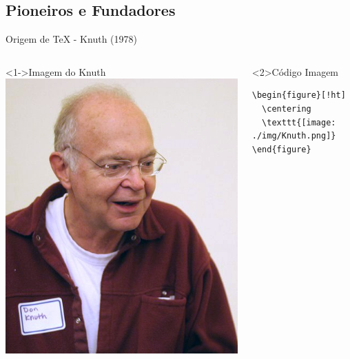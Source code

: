 \documentclass[bigger]{beamer}
\begin{document}
{\subsection{Pioneiros e Fundadores}
\label{sec:org29181d3}
\begin{frame}[label={sec:org22f25d4},fragile]{Origem de \TeX{} - Knuth (1978)}
 \begin{columns}
\begin{column}{0.48\columnwidth}
\begin{block}<1->{Imagem do Knuth}
\href{img/KnuthAtOpenContentAlliance.jpg}{\includegraphics[width=1.02\textwidth]{./img/KnuthAtOpenContentAlliance.jpg}}
\end{block}
\end{column}
\begin{column}{0.48\columnwidth}
\begin{block}<2>{Código Imagem}
\begin{verbatim}
\begin{figure}[!ht]
  \centering
  \texttt{[image: ./img/Knuth.png]}
\end{figure}
\end{verbatim}
\end{block}
\end{column}
\end{columns}
\end{frame}

}
\end{document}
